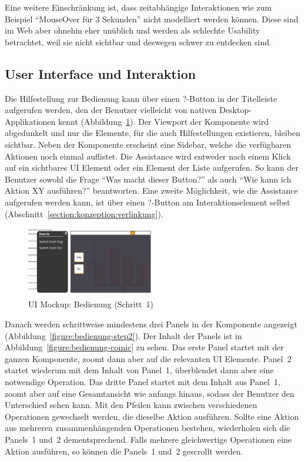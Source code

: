 \documentclass[
	headsepline,
	footsepline,
	fontsize=12pt,
	bibliography=totoc
]{scrbook}
\begin{document}
Eine weitere Einschränkung ist, dass zeitabhängige Interaktionen wie zum Beispiel \enquote{MouseOver für 3 Sekunden} nicht modelliert werden können. Diese sind im Web aber ohnehin eher unüblich und werden als schlechte Usability betrachtet, weil sie nicht sichtbar und deswegen schwer zu entdecken sind.

\subsection{User Interface und Interaktion}
\label{section:konzeption:bedienung:ui}


Die Hilfestellung zur Bedienung kann über einen ?-Button in der Titelleiste aufgerufen werden, den der Benutzer vielleicht von nativen Desktop-Applikationen kennt (Abbildung~\ref{figure:bedienung-step1}). Der Viewport der Komponente wird abgedunkelt und nur die Elemente, für die auch Hilfestellungen existieren, bleiben sichtbar. Neben der Komponente erscheint eine Sidebar, welche die verfügbaren Aktionen noch einmal auflistet. Die Assistance wird entweder nach einem Klick auf ein sichtbares UI Element oder ein Element der Liste aufgerufen. So kann der Benutzer sowohl die Frage \enquote{Was macht dieser Button?} als auch \enquote{Wie kann ich Aktion XY ausführen?} beantworten. Eine zweite Möglichkeit, wie die Assistance aufgerufen werden kann, ist über einen ?-Button am Interaktionselement selbst (Abschnitt~\ref{section:konzeption:verlinkung}).

\begin{figure}[htbp]
   \centering
   \includegraphics[width=0.5\textwidth]{images/konzeption-bedienung-step1.png}
   \caption{UI Mockup: Bedienung (Schritt~1)}
   \label{figure:bedienung-step1}
\end{figure}

Danach werden schrittweise mindestens drei Panels in der Komponente angezeigt (Abbildung~\ref{figure:bedienung-step2}). Der Inhalt der Panels ist in Abbildung~\ref{figure:bedienung-comic} zu sehen. Das erste Panel startet mit der ganzen Komponente, zoomt dann aber auf die relevanten UI Elemente. Panel~2 startet wiederum mit dem Inhalt von Panel~1, überblendet dann aber eine notwendige Operation. Das dritte Panel startet mit dem Inhalt aus Panel~1, zoomt aber auf eine Gesamtansicht wie anfangs hinaus, sodass der Benutzer den Unterschied sehen kann. Mit den Pfeilen kann zwischen verschiedenen Operationen gewechselt werden, die dieselbe Aktion ausführen. Sollte eine Aktion aus mehreren zusammenhängenden Operationen bestehen, wiederholen sich die Panels~1 und~2 dementsprechend. Falls mehrere gleichwertige Operationen eine Aktion ausführen, so können die Panels~1 und~2 gescrollt werden.
\end{document}
